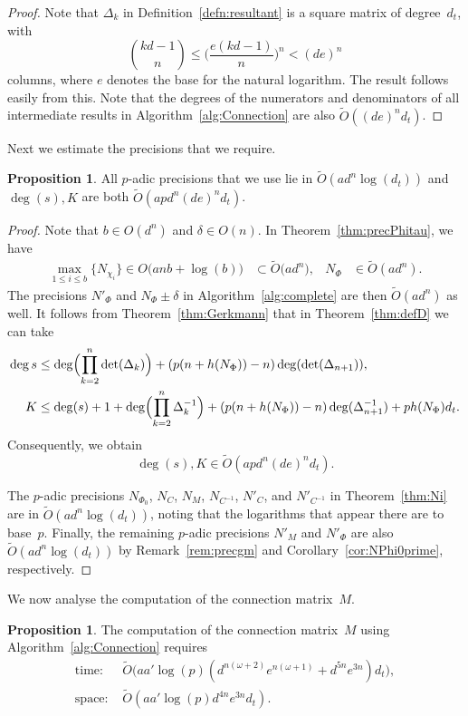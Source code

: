 \documentclass[a4paper,11pt]{article}
\numberwithin{equation}{section}
\providecommand{\BigOh}{O}          %
\providecommand{\SoftOh}{\tilde{O}} %
\theoremstyle{definition}
\newtheorem{prop}[thm]{Proposition}
\begin{document}
\begin{proof}
Note that $\Delta_k$ in Definition~\ref{defn:resultant} is a square matrix 
of degree~$d_t$, with
\[
{kd-1 \choose n} \leq \biggl( \frac{e(kd-1)}{n} \biggr)^n < (de)^n
\]
columns, where $e$ denotes the base for the natural logarithm. The result 
follows easily from this. Note that the degrees of the numerators and 
denominators of all intermediate results in Algorithm~\ref{alg:Connection} 
are also $\SoftOh((de)^n d_t)$.
\end{proof}

Next we estimate the precisions that we require.

\begin{prop}
All $p$-adic precisions that we use lie in $\SoftOh(a d^n \log(d_t))$ 
and $\deg(s), K$ are both $\SoftOh(apd^n (de)^n d_t)$.
\end{prop}

\begin{proof}
Note that $b \in \BigOh(d^n)$ and $\delta \in \BigOh(n)$.  
In Theorem~\ref{thm:precPhitau}, we have
\begin{align*}
\max_{1 \leq i \leq b} \{N_{\chi_i}\} \in \BigOh\bigl(a n b + \log(b) \bigr) 
            &\subset \SoftOh\bigl(a d^n \bigr),
&N_{\Phi}   &\in \SoftOh(a d^n).
\end{align*}
The precisions $N'_{\Phi}$ and $N_{\Phi} \pm \delta$ in 
Algorithm~\ref{alg:complete} are then $\SoftOh(ad^n)$ as well.
It follows from Theorem~\ref{thm:Gerkmann} that in
Theorem~\ref{thm:defD} we can take
\begin{align*}
\deg{s} &\leq \deg  \Bigl( \prod_{k=2}^n \det(\Delta_k) \Bigr) + (p(n+h(N_{\Phi}))-n) \deg(\det(\Delta_{n+1})), \\
K &\leq \deg(s)+ 1+\deg \Bigl(\prod_{k=2}^n \Delta_k^{-1}\Bigr) + (p(n+h(N_{\Phi}))-n) \deg(\Delta_{n+1}^{-1}) + ph(N_{\Phi}) d_t. 
\end{align*} 
Consequently, we obtain
\[
\deg(s), K \in \SoftOh(apd^n (de)^n d_t).
\]

The $p$-adic precisions $N_{\Phi_0}$, $N_C$, $N_M$, $N_{C^{-1}}$, $N'_{C}$, 
and $N'_{C^{-1}}$ in Theorem~\ref{thm:Ni} are in $\SoftOh(ad^n \log(d_t))$, 
noting that the logarithms that appear there are to base~$p$. Finally, the 
remaining $p$-adic precisions $N'_M$ and $N'_{\Phi}$ are also 
$\SoftOh(a d^n \log(d_t))$ by Remark~\ref{rem:precgm} and 
Corollary~\ref{cor:NPhi0prime}, respectively.
\end{proof}

We now analyse the computation of the connection matrix~$M$.
\begin{prop}
The computation of the connection matrix~$M$ using 
Algorithm~\ref{alg:Connection} requires
\begin{align*}
\mbox{time: }  & \SoftOh\bigl(a a' \log(p) (d^{n(\omega+2)} e^{n(\omega+1)}+ d^{5n}e^{3n} ) d_t\bigr), \\
\mbox{space: } & \SoftOh(a a' \log(p) d^{4n}e^{3n} d_t).
\end{align*}
\end{prop}
\end{document}
